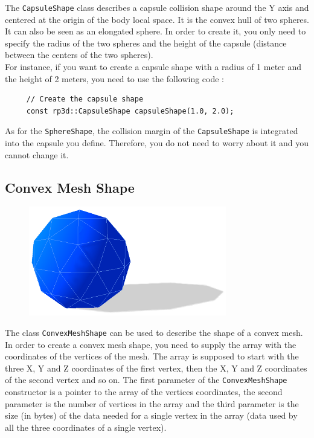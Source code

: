 \documentclass[a4paper,12pt]{article}
\begin{document}
    The \texttt{CapsuleShape} class describes a capsule collision shape around the Y axis and centered at the origin of the body local space. It is the convex hull of two
    spheres. It can also be seen as an elongated sphere. In order to create it, you only need to specify the radius of the two spheres and the height of the
    capsule (distance between the centers of the two spheres).  \\

    For instance, if you want to create a capsule shape with a radius of 1 meter and the height of 2 meters, you need to use the following code : \\

    \begin{lstlisting}
     // Create the capsule shape
     const rp3d::CapsuleShape capsuleShape(1.0, 2.0);
  \end{lstlisting}

    \vspace{0.6cm}

    As for the \texttt{SphereShape}, the collision margin of the \texttt{CapsuleShape} is integrated into the capsule you define.
    Therefore, you do not need to worry about it and you cannot change it.

    \subsection{Convex Mesh Shape}

    \begin{figure}[h]
        \centering
        \includegraphics{convexshape.png}
        \label{fig:convexshape}
    \end{figure}

    The class \texttt{ConvexMeshShape} can be used to describe the shape of a convex mesh. In order to create a convex mesh shape, you need to supply the array with the coordinates of
    the vertices of the mesh. The array is supposed to start with the three X, Y and Z coordinates of the first vertex, then the X, Y and Z coordinates of the second vertex and so on.
    The first parameter of the \texttt{ConvexMeshShape} constructor is a pointer to the array of the vertices coordinates, the second parameter is the number of vertices in the array and
    the third parameter is the size (in bytes) of the data needed for a single vertex in the array (data used by all the three coordinates of a single vertex).
\end{document}
